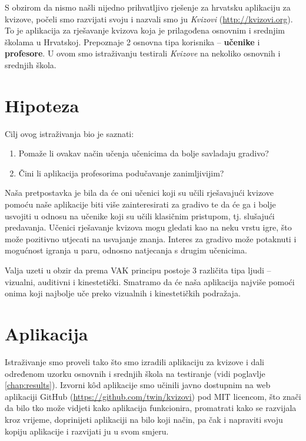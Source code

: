 \documentclass[11pt]{scrreprt}
\begin{document}
S obzirom da nismo našli nijedno prihvatljivo rješenje za hrvatsku aplikaciju
za kvizove, počeli smo razvijati svoju i nazvali smo ju \emph{Kvizovi}
(\url{http://kvizovi.org}). To je aplikacija za rješavanje kvizova koja je
prilagođena osnovnim i srednjim školama u Hrvatskoj. Prepoznaje 2 osnovna tipa
korisnika -- \textbf{učenike} i \textbf{profesore}. U ovom smo istraživanju
testirali \emph{Kvizove} na nekoliko osnovnih i srednjih škola.

\chapter{Hipoteza}

Cilj ovog istraživanja bio je saznati:

\begin{enumerate}
  \item Pomaže li ovakav način učenja učenicima da bolje savladaju gradivo?
  \item Čini li aplikacija profesorima podučavanje zanimljivijim?
\end{enumerate}

Naša pretpostavka je bila da će oni učenici koji su učili rješavajući kvizove
pomoću naše aplikacije biti više zainteresirati za gradivo te da će ga i bolje
usvojiti u odnosu na učenike koji su učili klasičnim pristupom, tj. slušajući
predavanja. Učenici rješavanje kvizova mogu gledati kao na neku vrstu igre, što
može pozitivno utjecati na usvajanje znanja. Interes za gradivo može potaknuti
i mogućnost igranja u paru, odnosno natjecanja s drugim učenicima.

Valja uzeti u obzir da prema VAK principu postoje 3 različita tipa ljudi --
vizualni, auditivni i kinestetički.\cite{clark11} Smatramo da će naša aplikacija
najviše pomoći onima koji najbolje uče preko vizualnih i kinestetičkih
podražaja.

\chapter{Aplikacija}

Istraživanje smo proveli tako što smo izradili aplikaciju za kvizove i dali
određenom uzorku osnovnih i srednjih škola na testiranje (vidi poglavlje
\ref{chap:results}). Izvorni kôd aplikacije smo učinili javno dostupnim na web
aplikaciji GitHub (\url{https://github.com/twin/kvizovi}) pod MIT licencom, što
znači da bilo tko može vidjeti kako aplikacija funkcionira, promatrati kako se
razvijala kroz vrijeme, doprinijeti aplikaciji na bilo koji način, pa čak i
napraviti svoju kopiju aplikacije i razvijati ju u svom smjeru.\cite{mit}
\end{document}
